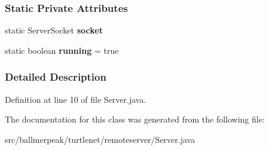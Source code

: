\subsubsection*{Static Private Attributes}
\begin{DoxyCompactItemize}
\item 
\hypertarget{classballmerpeak_1_1turtlenet_1_1remoteserver_1_1Server_a7c8eb04639b16695b20c36b55d3e1773}{static Server\-Socket {\bfseries socket}}\label{classballmerpeak_1_1turtlenet_1_1remoteserver_1_1Server_a7c8eb04639b16695b20c36b55d3e1773}

\item 
\hypertarget{classballmerpeak_1_1turtlenet_1_1remoteserver_1_1Server_abbb43613df0ad76d3bca12b361dc118f}{static boolean {\bfseries running} = true}\label{classballmerpeak_1_1turtlenet_1_1remoteserver_1_1Server_abbb43613df0ad76d3bca12b361dc118f}

\end{DoxyCompactItemize}


\subsubsection{Detailed Description}


Definition at line 10 of file Server.\-java.



The documentation for this class was generated from the following file\-:\begin{DoxyCompactItemize}
\item 
src/ballmerpeak/turtlenet/remoteserver/Server.\-java\end{DoxyCompactItemize}
